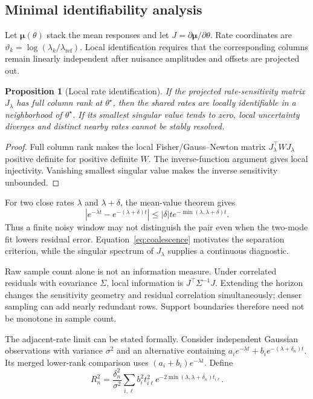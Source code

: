 \documentclass[11pt]{article}
\newtheorem{proposition}{Proposition}
\begin{document}
\subsection{Minimal identifiability analysis}
Let $\boldsymbol\mu(\theta)$ stack the mean responses and let $J=\partial\boldsymbol\mu/\partial\theta$. Rate coordinates are $\vartheta_k=\log(\lambda_k/\lambda_{\mathrm{ref}})$. Local identification requires that the corresponding columns remain linearly independent after nuisance amplitudes and offsets are projected out.

\begin{proposition}[Local rate identification]
If the projected rate-sensitivity matrix $J_\lambda$ has full column rank at $\theta^\star$, then the shared rates are locally identifiable in a neighborhood of $\theta^\star$. If its smallest singular value tends to zero, local uncertainty diverges and distinct nearby rates cannot be stably resolved.
\end{proposition}
\begin{proof}
Full column rank makes the local Fisher/Gauss--Newton matrix $J_\lambda^\top WJ_\lambda$ positive definite for positive definite $W$. The inverse-function argument gives local injectivity. Vanishing smallest singular value makes the inverse sensitivity unbounded.
\end{proof}

For two close rates $\lambda$ and $\lambda+\delta$, the mean-value theorem gives
\begin{equation}
|e^{-\lambda t}-e^{-(\lambda+\delta)t}|
\le |\delta|t e^{-\min(\lambda,\lambda+\delta)t}.
\label{eq:coalescence}
\end{equation}
Thus a finite noisy window may not distinguish the pair even when the two-mode fit lowers residual error. Equation~\eqref{eq:coalescence} motivates the separation criterion, while the singular spectrum of $J_\lambda$ supplies a continuous diagnostic.

Raw sample count alone is not an information measure. Under correlated residuals with covariance $\Sigma$, local information is $J^\top\Sigma^{-1}J$. Extending the horizon changes the sensitivity geometry and residual correlation simultaneously; denser sampling can add nearly redundant rows. Support boundaries therefore need not be monotone in sample count.

The adjacent-rate limit can be stated formally. Consider independent Gaussian observations with variance $\sigma^2$ and an alternative containing $a_i e^{-\lambda t}+b_i e^{-(\lambda+\delta_n)t}$. Its merged lower-rank comparison uses $(a_i+b_i)e^{-\lambda t}$. Define
\begin{equation}
R_n^2=\frac{\delta_n^2}{\sigma^2}\sum_{i,\ell}b_i^2t_{i\ell}^2
e^{-2\min(\lambda,\lambda+\delta_n)t_{i\ell}}.
\label{eq:boundary-index}
\end{equation}
\end{document}
